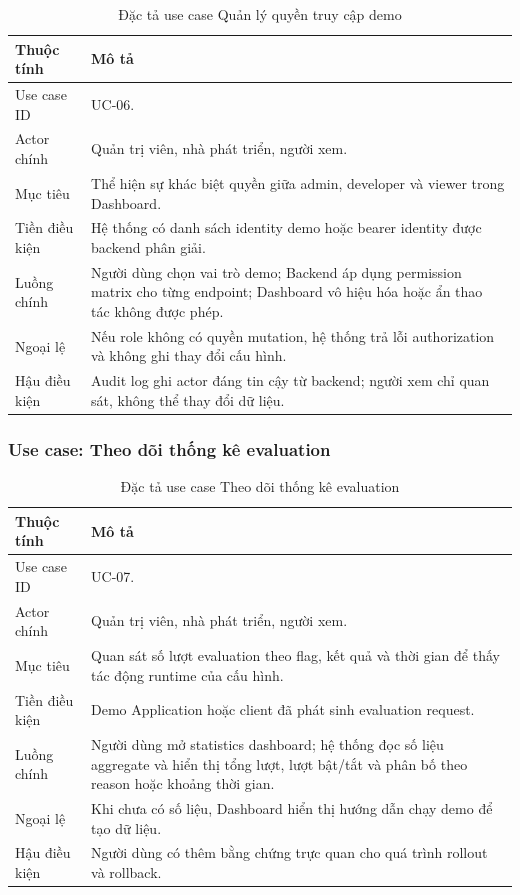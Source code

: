 \begin{table}[H]
    \centering
    \caption{Đặc tả use case Quản lý quyền truy cập demo}
    \label{tab:uc-demo-rbac}
    \begin{tabular}{p{} p{}}
        \toprule
        \textbf{Thuộc tính} & \textbf{Mô tả} \\
        \midrule
        Use case ID & UC-06. \\
        Actor chính & Quản trị viên, nhà phát triển, người xem. \\
        Mục tiêu & Thể hiện sự khác biệt quyền giữa admin, developer và viewer trong Dashboard. \\
        Tiền điều kiện & Hệ thống có danh sách identity demo hoặc bearer identity được backend phân giải. \\
        Luồng chính & Người dùng chọn vai trò demo; Backend áp dụng permission matrix cho từng endpoint; Dashboard vô hiệu hóa hoặc ẩn thao tác không được phép. \\
        Ngoại lệ & Nếu role không có quyền mutation, hệ thống trả lỗi authorization và không ghi thay đổi cấu hình. \\
        Hậu điều kiện & Audit log ghi actor đáng tin cậy từ backend; người xem chỉ quan sát, không thể thay đổi dữ liệu. \\
        \bottomrule
    \end{tabular}
\end{table}

\subsubsection{Use case: Theo dõi thống kê evaluation}

\begin{table}[H]
    \centering
    \caption{Đặc tả use case Theo dõi thống kê evaluation}
    \label{tab:uc-view-evaluation-statistics}
    \begin{tabular}{p{} p{}}
        \toprule
        \textbf{Thuộc tính} & \textbf{Mô tả} \\
        \midrule
        Use case ID & UC-07. \\
        Actor chính & Quản trị viên, nhà phát triển, người xem. \\
        Mục tiêu & Quan sát số lượt evaluation theo flag, kết quả và thời gian để thấy tác động runtime của cấu hình. \\
        Tiền điều kiện & Demo Application hoặc client đã phát sinh evaluation request. \\
        Luồng chính & Người dùng mở statistics dashboard; hệ thống đọc số liệu aggregate và hiển thị tổng lượt, lượt bật/tắt và phân bố theo reason hoặc khoảng thời gian. \\
        Ngoại lệ & Khi chưa có số liệu, Dashboard hiển thị hướng dẫn chạy demo để tạo dữ liệu. \\
        Hậu điều kiện & Người dùng có thêm bằng chứng trực quan cho quá trình rollout và rollback. \\
        \bottomrule
    \end{tabular}
\end{table}


